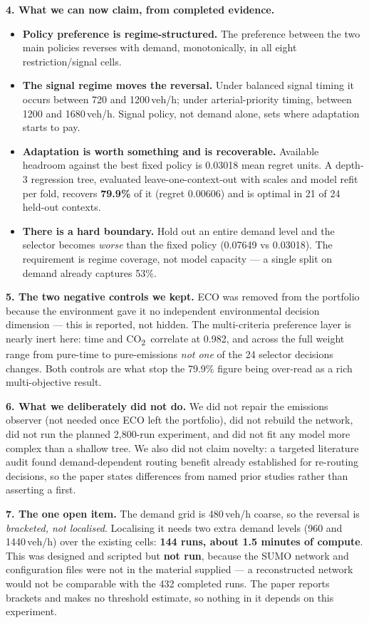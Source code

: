 \documentclass[10pt,a4paper]{article}
\newcommand{\CO}{CO\textsubscript{2}}
\begin{document}
\textbf{4. What we can now claim, from completed evidence.}
\begin{itemize}\itemsep1pt
\item \textbf{Policy preference is regime-structured.} The preference between the two main policies reverses with demand, monotonically, in all eight restriction/signal cells.
\item \textbf{The signal regime moves the reversal.} Under balanced signal timing it occurs between 720 and 1200\,veh/h; under arterial-priority timing, between 1200 and 1680\,veh/h. Signal policy, not demand alone, sets where adaptation starts to pay.
\item \textbf{Adaptation is worth something and is recoverable.} Available headroom against the best fixed policy is 0.03018 mean regret units. A depth-3 regression tree, evaluated leave-one-context-out with scales and model refit per fold, recovers \textbf{79.9\%} of it (regret 0.00606) and is optimal in 21 of 24 held-out contexts.
\item \textbf{There is a hard boundary.} Hold out an entire demand level and the selector becomes \emph{worse} than the fixed policy (0.07649 vs 0.03018). The requirement is regime coverage, not model capacity --- a single split on demand already captures 53\%.
\end{itemize}

\textbf{5. The two negative controls we kept.}
ECO was removed from the portfolio because the environment gave it no independent environmental decision dimension --- this is reported, not hidden. The multi-criteria preference layer is nearly inert here: time and \CO\ correlate at 0.982, and across the full weight range from pure-time to pure-emissions \emph{not one} of the 24 selector decisions changes. Both controls are what stop the 79.9\% figure being over-read as a rich multi-objective result.

\textbf{6. What we deliberately did not do.}
We did not repair the emissions observer (not needed once ECO left the portfolio), did not rebuild the network, did not run the planned 2{,}800-run experiment, and did not fit any model more complex than a shallow tree. We also did not claim novelty: a targeted literature audit found demand-dependent routing benefit already established for re-routing decisions, so the paper states differences from named prior studies rather than asserting a first.

\textbf{7. The one open item.}
The demand grid is 480\,veh/h coarse, so the reversal is \emph{bracketed, not localised}. Localising it needs two extra demand levels (960 and 1440\,veh/h) over the existing cells: \textbf{144 runs, about 1.5 minutes of compute}. This was designed and scripted but \textbf{not run}, because the SUMO network and configuration files were not in the material supplied --- a reconstructed network would not be comparable with the 432 completed runs. The paper reports brackets and makes no threshold estimate, so nothing in it depends on this experiment.
\end{document}

